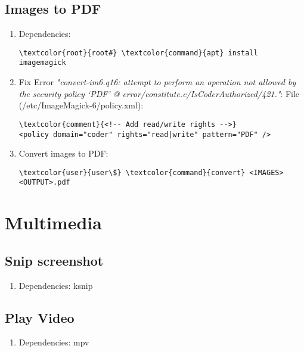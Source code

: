 \documentclass[10pt, a4paper, onecolumn, openany]{book} %
\begin{document}
\subsection{Images to PDF}
\begin{enumerate}
    \item Dependencies:
\begin{Verbatim}[commandchars=\\\{\}]
\textcolor{root}{root#} \textcolor{command}{apt} install imagemagick
\end{Verbatim}
    \item Fix Error \textit{"convert-im6.q16: attempt to perform an operation not allowed by the security policy `PDF' @ error/constitute.c/IsCoderAuthorized/421."}:
\newline File (\textcolor{file}{/etc/ImageMagick-6/policy.xml}):
\begin{Verbatim}[commandchars=\\\{\}]
\textcolor{comment}{<!-- Add read/write rights -->}
<policy domain="coder" rights="read|write" pattern="PDF" />
\end{Verbatim}
    \item Convert images to PDF:
\begin{Verbatim}[commandchars=\\\{\}]
\textcolor{user}{user\$} \textcolor{command}{convert} <IMAGES> <OUTPUT>.pdf
\end{Verbatim}
\end{enumerate}
\section{Multimedia}
\subsection{Snip screenshot}
\begin{enumerate}
    \item Dependencies: ksnip
\end{enumerate}
\subsection{Play Video}
\begin{enumerate}
    \item Dependencies: mpv
\end{enumerate}
\end{document}
